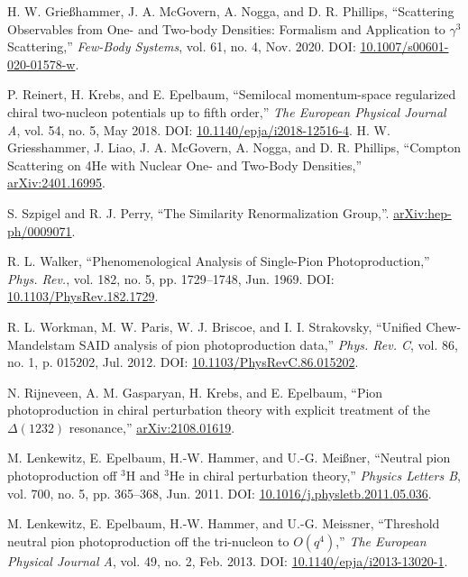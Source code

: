 \documentclass[a4paper,11pt]{article}
\begin{document}
\begin{thebibliography}{99}
  H. W. Grie{\ss}hammer, J. A. McGovern, A. Nogga, and D. R.
  Phillips, ``Scattering Observables from One- and Two-body
  Densities: Formalism and Application to $\gamma^3$ Scattering,''
  \textit{Few-Body Systems}, vol. 61, no. 4, Nov. 2020. DOI:
  \href{https://doi.org/10.1007/s00601-020-01578-w}{10.1007/s00601-020-01578-w}.

  P. Reinert, H. Krebs, and E. Epelbaum, ``Semilocal momentum-space
  regularized chiral two-nucleon potentials up to fifth order,''
  \textit{The European Physical Journal A}, vol. 54, no. 5, May 2018.
  DOI:
  \href{http://dx.doi.org/10.1140/epja/i2018-12516-4}{10.1140/epja/i2018-12516-4}.
  H. W. Griesshammer, J. Liao, J. A. McGovern, A. Nogga, and D. R.
  Phillips, ``Compton Scattering on 4He with Nuclear One- and
  Two-Body Densities,''
  \href{https://arxiv.org/abs/2401.16995}{arXiv:2401.16995}.

  S. Szpigel and R. J. Perry, ``The Similarity Renormalization
  Group,''.
  \href{https://arxiv.org/abs/hep-ph/0009071}{arXiv:hep-ph/0009071}.

  R. L. Walker, ``Phenomenological Analysis of Single-Pion
  Photoproduction,'' \textit{Phys. Rev.}, vol. 182, no. 5, pp.
  1729--1748, Jun. 1969. DOI:
  \href{https://link.aps.org/doi/10.1103/PhysRev.182.1729}{10.1103/PhysRev.182.1729}.

  R. L. Workman, M. W. Paris, W. J. Briscoe, and I. I. Strakovsky,
  ``Unified Chew-Mandelstam SAID analysis of pion photoproduction
  data,'' \textit{Phys. Rev. C}, vol. 86, no. 1, p. 015202, Jul.
  2012. DOI:
  \href{https://link.aps.org/doi/10.1103/PhysRevC.86.015202}{10.1103/PhysRevC.86.015202}.

N. Rijneveen, A. M. Gasparyan, H. Krebs, and E. Epelbaum, ``Pion photoproduction in chiral perturbation theory with explicit treatment of the $\Delta(1232)$ resonance,''  \href{https://arxiv.org/abs/2108.01619}{arXiv:2108.01619}.

M. Lenkewitz, E. Epelbaum, H.-W. Hammer, and U.-G. Meißner, ``Neutral pion photoproduction off $^3$H and $^3$He in chiral perturbation theory,'' \textit{Physics Letters B}, vol. 700, no. 5, pp. 365–368, Jun. 2011. DOI: \href{http://dx.doi.org/10.1016/j.physletb.2011.05.036}{10.1016/j.physletb.2011.05.036}.

M. Lenkewitz, E. Epelbaum, H.-W. Hammer, and U.-G. Meissner, ``Threshold neutral pion photoproduction off the tri-nucleon to $O(q^4)$,'' \textit{The European Physical Journal A}, vol. 49, no. 2, Feb. 2013. DOI: \href{http://dx.doi.org/10.1140/epja/i2013-13020-1}{10.1140/epja/i2013-13020-1}.


\end{thebibliography}
\end{document}
